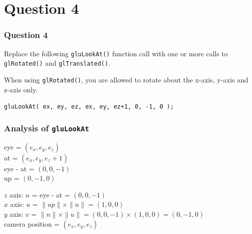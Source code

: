 \documentclass{beamer}
\begin{document}

\section{Question 4}

\begin{frame}
    \frametitle{Question 4}
    Replace the following \texttt{gluLookAt()} function call with one or more calls to 
    \texttt{glRotated()} and \texttt{glTranslated()}.

    When using \texttt{glRotated()}, you are allowed to rotate about the x-axis, 
    y-axis and z-axis only.

    \vspace{1em}

    \begin{tcolorbox}[colback=violet!5!white]
        \centering
        \texttt{gluLookAt( ex, ey, ez, ex, ey, ez+1, 0, -1, 0 );}
    \end{tcolorbox}
\end{frame}

\begin{frame}
    \frametitle{Analysis of \texttt{gluLookAt}}

    eye = $(e_x, e_y, e_z)$\\
    at = $(e_x, e_y, e_z+1)$\\
    eye - at = $(0, 0, -1)$\\
    up = $(0, -1, 0)$\\

    \vspace{1em}

    \begin{tcolorbox}
        $z$ axis: $n$ = eye - at = $(0, 0, -1)$\\
        $x$ axis: $u$ = $\|up\| \times \|n\| = (1, 0, 0)$\\
        $y$ axis: $v$ = $\|n\| \times \|u\| = (0, 0, -1) \times (1, 0, 0) = (0, -1, 0)$\\
        camera position = $(e_x, e_y, e_z)$\\
    \end{tcolorbox}

\end{frame}
\end{document}
